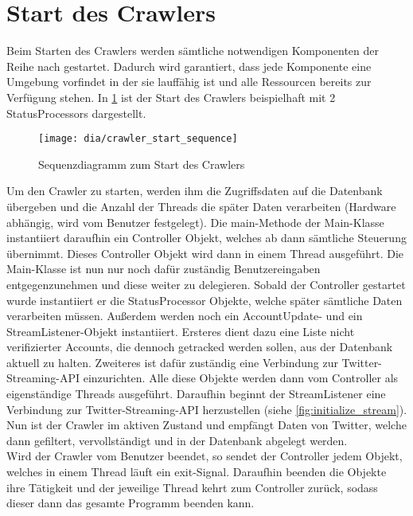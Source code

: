 \section{Start des Crawlers}
Beim Starten des Crawlers werden sämtliche notwendigen Komponenten der Reihe nach gestartet. Dadurch wird garantiert, dass jede Komponente eine Umgebung vorfindet in der sie lauffähig ist und alle Ressourcen bereits zur Verfügung stehen. In \cref{fig:crawler_start} ist der Start des Crawlers beispielhaft mit 2 StatusProcessors dargestellt.

\begin{figure}[h!]
	\centering
	\texttt{[image: dia/crawler\_start\_sequence]}
	\caption{Sequenzdiagramm zum Start des Crawlers}
	\label{fig:crawler_start}
\end{figure}

Um den Crawler zu starten, werden ihm die Zugriffsdaten auf die Datenbank übergeben und die Anzahl der Threads die später Daten verarbeiten (Hardware abhängig, wird vom Benutzer festgelegt).
Die main-Methode der Main-Klasse instantiiert daraufhin ein Controller Objekt, welches ab dann sämtliche Steuerung übernimmt. Dieses Controller Objekt wird dann in einem Thread ausgeführt. Die Main-Klasse ist nun nur noch dafür zuständig Benutzereingaben entgegenzunehmen und diese weiter zu delegieren.
Sobald der Controller gestartet wurde instantiiert er die StatusProcessor Objekte, welche später sämtliche Daten verarbeiten müssen. Außerdem werden noch ein AccountUpdate- und ein StreamListener-Objekt instantiiert. Ersteres dient dazu eine Liste nicht verifizierter Accounts, die dennoch getracked werden sollen, aus der Datenbank aktuell zu halten. Zweiteres ist dafür zuständig eine Verbindung zur Twitter-Streaming-API einzurichten. Alle diese Objekte werden dann vom Controller als eigenständige Threads ausgeführt.
Daraufhin beginnt der StreamListener eine Verbindung zur Twitter-Streaming-API herzustellen (siehe \cref{fig:initialize_stream}).\\
Nun ist der Crawler im aktiven Zustand und empfängt Daten von Twitter, welche dann gefiltert, vervollständigt und in der Datenbank abgelegt werden.\\
Wird der Crawler vom Benutzer beendet, so sendet der Controller jedem Objekt, welches in einem Thread läuft ein exit-Signal. Daraufhin beenden die Objekte ihre Tätigkeit und der jeweilige Thread kehrt zum Controller zurück, sodass dieser dann das gesamte Programm beenden kann.
\\

